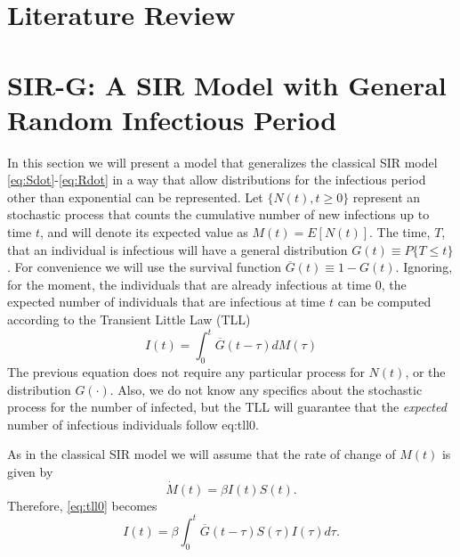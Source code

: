 \documentclass[twoside,USenglish,10pt]{article}
\newcommand{\Gb}{\overline{G}\xspace}
\begin{document}
\section{Literature Review}\label{sc:litrev}



\section{SIR-G: A SIR Model with General Random Infectious Period}\label{sc:model}

In this section we will present a model that generalizes the classical SIR model \eqref{eq:Sdot}-\eqref{eq:Rdot} in a way that allow distributions for the infectious period other than exponential can be represented.
Let $\{N(t),t\geq 0\}$ represent an stochastic process that counts the cumulative number of new infections up to time $t$, and will denote its expected value as $M(t)=E[N(t)]$. 
The time, $T$, that an individual is infectious will have a general distribution $G(t)\equiv P\{T\leq t\}$.
For convenience we will use the survival function $\Gb(t) \equiv 1-G(t)$. Ignoring, for the moment, the individuals that are already infectious at time $0$, the expected number of individuals that are infectious at time $t$ can be computed according to the Transient Little Law (TLL) \cite{fral.ea:tll} 
\begin{equation}
	I(t) = \int_0^t \Gb(t-\tau) dM(\tau)   \label{eq:tll0}
\end{equation} 
The previous equation does not require any particular process for $N(t)$, or the distribution $G(\cdot)$. Also, we do not know any specifics about the stochastic process for the number of infected, but the TLL will guarantee that the  \textit{expected} number of infectious individuals follow {eq:tll0}.

As in the classical SIR model we will assume that the rate of change of $M(t)$ is given by
\begin{equation}
\dot{M}(t) = \beta I(t)S(t).
\label{eq:dM}
\end{equation}
Therefore, \eqref{eq:tll0} becomes
\begin{equation}
	I(t) = \beta\int_0^t \Gb(t-\tau) S(\tau)I(\tau)d\tau.   \label{eq:tll}
\end{equation}
\end{document}
